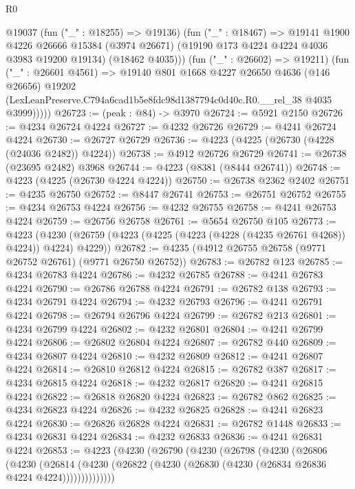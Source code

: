 \begin{lexlean}{R0}
\begin{coremodule}
            @19037
            (fun ("_" : @18255) => @19136)
            (fun ("_" : @18467) =>
            @19141
              @1900
              @4226
              @26666
              @15384
              (@3974 @26671)
              (@19190 @173 @4224 @4224 @4036 @3983 @19200 @19134)
              (@18462 @4035)))
          (fun ("_" : @26602) => @19211)
          (fun ("_" : @26601 @4561) =>
          @19140
            @801
            @1668
            @4227
            @26650
            @4636
            (@146 @26656)
            @19202
            (LexLeanPreserve.C794a6cad1b5e8fdc98d1387794c0d40c.R0.__rel_38 @4035 @3999)))))
@26723 := (peak : @84) -> @3970
@26724 := @5921 @2150
@26726 := @4234 @26724 @4224
@26727 := @4232 @26726
@26729 := @4241 @26724 @4224
@26730 := @26727 @26729
@26736 := @4223 (@4225 (@26730 (@4228 (@24036 @2482)) @4224))
@26738 := @4912 @26726 @26729
@26741 := @26738 (@23695 @2482) @3968
@26744 := @4223 (@8381 (@8444 @26741))
@26748 := @4223 (@4225 (@26730 @4224 @4224))
@26750 := @26738 @2362 @2402
@26751 := @4235 @26750
@26752 := @8447 @26741
@26753 := @26751 @26752
@26755 := @4234 @26753 @4224
@26756 := @4232 @26755
@26758 := @4241 @26753 @4224
@26759 := @26756 @26758
@26761 := @5654 @26750 @105
@26773 := @4223
    (@4230 (@26759 (@4223 (@4225 (@4223 (@4228 (@4235 @26761 @4268)) @4224)) @4224) @4229))
@26782 := @4235 (@4912 @26755 @26758 (@9771 @26752 @26761) (@9771 @26750 @26752))
@26783 := @26782 @123
@26785 := @4234 @26783 @4224
@26786 := @4232 @26785
@26788 := @4241 @26783 @4224
@26790 := @26786 @26788 @4224
@26791 := @26782 @138
@26793 := @4234 @26791 @4224
@26794 := @4232 @26793
@26796 := @4241 @26791 @4224
@26798 := @26794 @26796 @4224
@26799 := @26782 @213
@26801 := @4234 @26799 @4224
@26802 := @4232 @26801
@26804 := @4241 @26799 @4224
@26806 := @26802 @26804 @4224
@26807 := @26782 @440
@26809 := @4234 @26807 @4224
@26810 := @4232 @26809
@26812 := @4241 @26807 @4224
@26814 := @26810 @26812 @4224
@26815 := @26782 @387
@26817 := @4234 @26815 @4224
@26818 := @4232 @26817
@26820 := @4241 @26815 @4224
@26822 := @26818 @26820 @4224
@26823 := @26782 @862
@26825 := @4234 @26823 @4224
@26826 := @4232 @26825
@26828 := @4241 @26823 @4224
@26830 := @26826 @26828 @4224
@26831 := @26782 @1448
@26833 := @4234 @26831 @4224
@26834 := @4232 @26833
@26836 := @4241 @26831 @4224
@26853 := @4223
    (@4230
      (@26790
        (@4230
          (@26798
            (@4230
              (@26806
                (@4230
                  (@26814
                    (@4230 (@26822 (@4230 (@26830 (@4230 (@26834 @26836 @4224 @4224))))))))))))))

\end{coremodule}
\end{lexlean}
